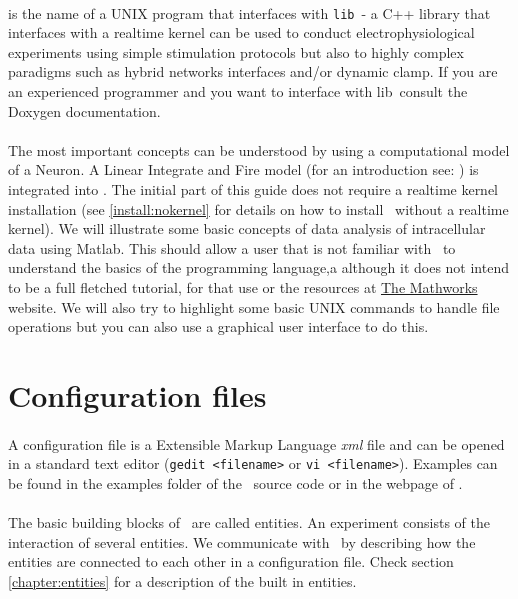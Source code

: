 \paragraph{}
\textbf{\progname} is the name of a UNIX program that interfaces with \texttt{lib\progname}\  - a C++ library that interfaces with a realtime kernel can be used to conduct electrophysiological experiments using simple stimulation protocols but also to highly complex paradigms such as hybrid networks interfaces and/or dynamic clamp. If you are an experienced programmer and you want to interface with lib\progname\, consult the Doxygen documentation.

\paragraph{}
The most important concepts can be understood by using a computational model of a Neuron. A Linear Integrate and Fire model (for an introduction see: \cite{Koch:1989}) is integrated into \progname. The initial part of this guide does not require a realtime kernel installation (see \ref{install:nokernel} for details on how to install \progname\ without a realtime kernel).
We will illustrate some basic concepts of data analysis of intracellular data using Matlab. This should allow a user that is not familiar with \matlab\ to understand the basics of the programming language,a although it does not intend to be a full fletched tutorial, for that use \cite{wallisch2011} or the resources at \href{http://www.mathworks.com}{The Mathworks} website. We will also try to highlight some basic UNIX commands to handle file operations but you can also use a graphical user interface to do this. 

\section{Configuration files}
\paragraph{}
A configuration file is a Extensible Markup Language \emph{xml} file and can be opened in a standard text editor (\texttt{gedit <filename>} or \texttt{vi <filename>}). Examples can be found in the examples folder of the \progname\ source code or in the webpage of \href{http://www.tnb.ua.ac.be}{\progname}.

\paragraph{}
The basic building blocks of \progname\ are called entities. An experiment consists of the interaction of several entities. We communicate with \progname\ by describing how the entities are connected to each other in a configuration file. Check section \ref{chapter:entities} for a description of the built in entities.

